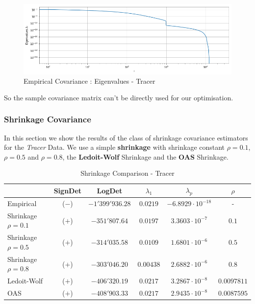 \begin{figure}[h!]
\centering
    \includegraphics[width=0.7\linewidth]{figures/Covariance/Tracer_23643/cov_emp_eigenval_loglog}
    \caption{Empirical Covariance : Eigenvalues - Tracer}
    \label{fig:cov:emp:eigs}
\end{figure}

So the sample covariance matrix can't be directly used for our optimisation.  

\subsubsection{Shrinkage Covariance}

In this section we show the results of the class of shrinkage covariance estimators for the \textit{Tracer} Data. We use a simple \textbf{shrinkage} with shrinkage constant $\rho = 0.1$,  $\rho = 0.5$ and $\rho = 0.8$,  the \textbf{Ledoit-Wolf} Shrinkage and the \textbf{OAS} Shrinkage. 

\begin{table}[h]
\centering
    \begin{tabular}{l|ccccc}
     \toprule
        & SignDet & LogDet & $\lambda_1$ & $\lambda_p$ & $\rho$ \\ \midrule
        Empirical & ($-$) & $-1'399'936.28$ &  $0.0219$ & $-6.8929 \cdot 10^{-18}$ & -\\
        Shrinkage $\rho=0.1$ & ($+$) & $-351'807.64$ &  $0.0197$ &$3.3603\cdot 10^{-7}$ & $0.1$\\
        Shrinkage $\rho=0.5$ & ($+$) & $-314'035.58$ &  $0.0109$  &$1.6801 \cdot 10^{-6}$ & $0.5$\\
        Shrinkage $\rho=0.8$ & ($+$) & $-303'046.20$ &  $0.00438$  &$2.6882 \cdot 10^{-6}$ & $0.8$\\
        Ledoit-Wolf & ($+$) & $-406'320.19$&  $0.0217$ & $3.2867\cdot 10^{-8}$ & $0.0097811$\\
        OAS & ($+$) & $-408'903.33$ & $0.0217$ & $2.9435\cdot 10^{-8}$ & $0.0087595$ \\  \bottomrule
    \end{tabular}
    \caption{Shrinkage Comparison - Tracer}
\end{table}

